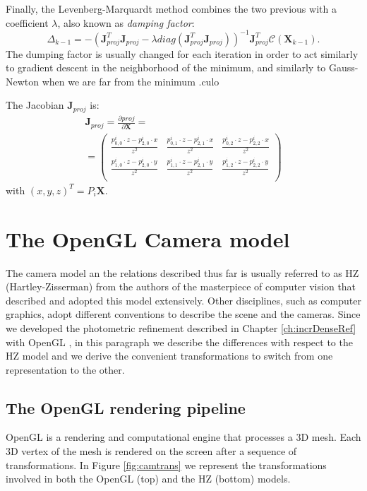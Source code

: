 Finally, the Levenberg-Marquardt method combines the two previous with a coefficient $\lambda$, also known as \emph{damping factor}:
\begin{equation}
  \label{eq:l-m}
 \Delta_{k-1} = - (\mathbf{J}_{proj}^T\mathbf{J}_{proj} - \lambda diag(\mathbf{J}_{proj}^T \mathbf{J}_{proj}))^{-1}\mathbf{J}_{proj}^T \mathcal{C}(\mathbf{X}_{k-1}).
\end{equation}
The dumping factor is usually changed for each iteration in order to act similarly to gradient descent in the neighborhood of the minimum, and similarly to Gauss-Newton when we are far from the minimum \cite{Lo05}.culo

The Jacobian $\mathbf{J}_{proj}$ is:
\begin{multline}
  \mathbf{J}_{proj}=\frac{\partial proj}{\partial \mathbf{X}} = \\ =
  \begin{pmatrix}
   \frac{p_{0,0}^i \cdot z - p_{2,0}^i \cdot x}{z^2} & \frac{p_{0,1}^i \cdot z - p_{2,1}^i \cdot x}{z^2} & \frac{p_{0,2}^i \cdot z - p_{2,2}^i \cdot x}{z^2}\\
   \frac{p_{1,0}^i \cdot z - p_{2,0}^i \cdot y}{z^2} & \frac{p_{1,1}^i \cdot z - p_{2,1}^i \cdot y}{z^2} & \frac{p_{1,2}^i \cdot z - p_{2,2}^i \cdot y}{z^2}\\
  \end{pmatrix}
\end{multline}
with $(x,y,z)^T = P_i \mathbf{X}$.


\section{The OpenGL Camera model}
The camera model an the relations described thus far is usually referred to as HZ (Hartley-Zisserman) from the authors of the masterpiece of computer vision \cite{hazi04} that described and adopted this model extensively.
Other disciplines, such as computer graphics, adopt different conventions to describe the scene and the cameras. 
Since we developed the photometric refinement described in Chapter \ref{ch:incrDenseRef} with OpenGL \cite{opengl}, in this paragraph we describe the differences with respect to the HZ model and we derive the convenient transformations to switch from one representation to the other.

\subsection{The OpenGL rendering pipeline}
OpenGL is a rendering and computational engine that processes a 3D mesh. 
Each 3D vertex of the mesh is rendered on the screen after a sequence of transformations. In Figure \ref{fig:camtrans} we represent the transformations involved in both the OpenGL (top) and the HZ (bottom) models.


